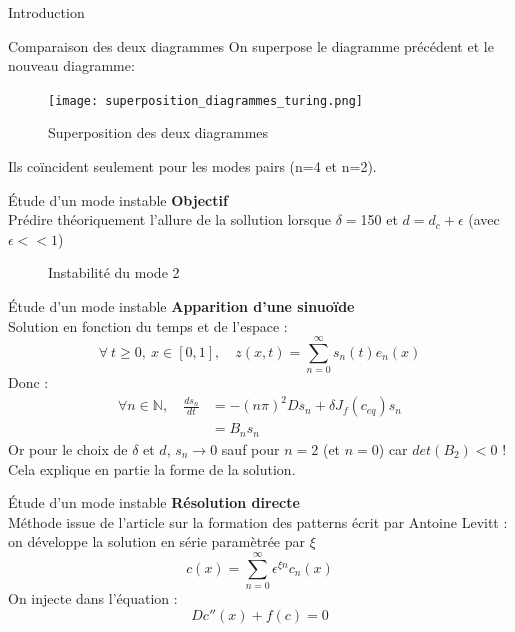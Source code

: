 \documentclass{beamer}
\begin{document}
\begin{frame}{Introduction}
\begin{frame}{Comparaison des deux diagrammes}
On superpose le diagramme précédent et le nouveau diagramme:
\begin{figure}
\texttt{[image: superposition\_diagrammes\_turing.png]}
\caption{Superposition des deux diagrammes}
\end{figure}
Ils coïncident seulement pour les modes pairs (n=4 et n=2).
\end{frame}






\begin{frame}{\'Etude d'un mode instable}
\textbf{Objectif}\\
Prédire théoriquement l'allure de la sollution lorsque $\delta=$150 et $d=d_c +\epsilon$ (avec $\epsilon<<1$)
\begin{figure}
\begin{subfigure}
\texttt{[image: diagrammes\_turing1.png]}
\end{subfigure}
\begin{subfigure}
\texttt{[image: graph1.png]}
\end{subfigure}
\caption{\label{fig:graph1}Instabilité du mode 2}
\end{figure}
\end{frame}

\begin{frame}{\'Etude d'un mode instable}
\textbf{Apparition d'une sinuoïde}\\
Solution en fonction du temps et de l'espace :
\begin{equation}
    \forall \  t\geq 0 ,\ x \in [0,1], \quad  z(x,t) = \sum_{n=0}^{\infty} s_{n}(t)e_{n}(x)
\end{equation}
Donc : 
\begin{equation}
\begin{split}
    \forall n \in \mathbb{N}, \quad \frac{d s_{n}}{dt} & = -(n \pi)^{2}D s_{n} + \delta J_{f}(c_{eq}) s_{n} \\
    & = B_{n} s_{n}
\end{split}
\end{equation}
Or pour le choix de $\delta$ et $d$, $s_n \longrightarrow 0$ sauf pour $n=2$ (et $n=0$) car $det(B_2)<0$ ! Cela explique en partie la forme de la solution.
\end{frame}

\begin{frame}{\'Etude d'un mode instable}
\textbf{Résolution directe}\\
Méthode issue de l'article sur la formation des patterns écrit par Antoine Levitt : on développe la solution en série paramètrée par $\xi$
\begin{equation}
c(x) = \sum_{n=0}^{\infty} \epsilon^{\xi n} c_n (x)
\end{equation}
On injecte dans l'équation : 
\begin{equation}
Dc''(x) + f(c)=0
\end{equation}
\end{frame}


\end{frame}
\end{document}
